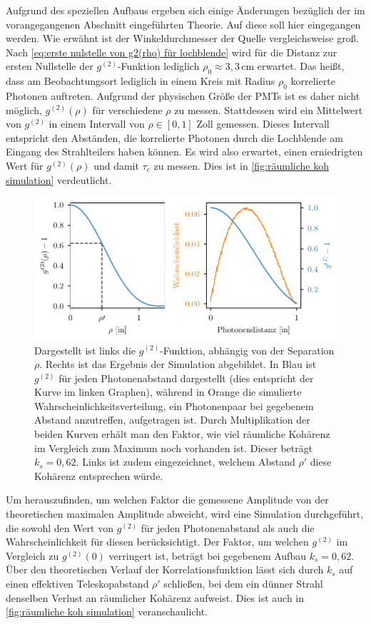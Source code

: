 Aufgrund des speziellen Aufbaus ergeben sich einige Änderungen bezüglich der im vorangegangenen Abschnitt eingeführten Theorie. 
Auf diese soll hier eingegangen werden. 
Wie erwähnt ist der Winkeldurchmesser der Quelle vergleichsweise groß. 
Nach \autoref{eq:erste nulstelle von g2(rho) für lochblende} wird für die Distanz zur ersten Nullstelle der $g^{(2)}$-Funktion lediglich $\rho_0\approx3,3\,\mathrm{cm}$ erwartet. 
Das heißt, dass am Beobachtungsort lediglich in einem Kreis mit Radius $\rho_0$ korrelierte Photonen auftreten. 
Aufgrund der physischen Größe der PMTs ist es daher nicht möglich, $g^{(2)}(\rho)$ für verschiedene $\rho$ zu messen. 
Stattdessen wird ein Mittelwert von $g^{(2)}$ in einem Intervall von $\rho\in[0,1]$ Zoll gemessen. 
Dieses Intervall entspricht den Abständen, die korrelierte Photonen durch die Lochblende am Eingang des Strahlteilers haben können. 
Es wird also erwartet, einen erniedrigten Wert für $g^{(2)}(\rho)$ und damit $\tau_c$ zu messen. 
Dies ist in \autoref{fig:räumliche koh simulation} verdeutlicht. 
\begin{figure}[h]
    \centering
    \includegraphics{images/Aufbau/g2(rho).pdf}
    \caption{Dargestellt ist links die $g^{(2)}$-Funktion, abhängig von der Separation $\rho$. Rechts ist das Ergebnis der Simulation abgebildet. In Blau ist $g^{(2)}$ für jeden Photonenabstand dargestellt (dies entspricht der Kurve im linken Graphen), während in Orange die simulierte Wahrscheinlichkeitsverteilung, ein Photonenpaar bei gegebenem Abstand anzutreffen, aufgetragen ist. Durch Multiplikation der beiden Kurven erhält man den Faktor, wie viel räumliche Kohärenz im Vergleich zum Maximum noch vorhanden ist. Dieser beträgt $k_s=0,62$. Links ist zudem eingezeichnet, welchem Abstand $\rho\prime$ diese Kohärenz entsprechen würde. }
    \label{fig:räumliche koh simulation}
\end{figure}
Um herauszufinden, um welchen Faktor die gemessene Amplitude von der theoretischen maximalen Amplitude abweicht, wird eine Simulation durchgeführt, die sowohl den Wert von $g^{(2)}$ für jeden Photonenabstand als auch die Wahrscheinlichkeit für diesen berücksichtigt. 
Der Faktor, um welchen $g^{(2)}$ im Vergleich zu $g^{(2)}(0)$ verringert ist, beträgt bei gegebenem Aufbau $k_s=0,62$. 
Über den theoretischen Verlauf der Korrelationsfunktion lässt sich durch $k_s$ auf einen effektiven Teleskopabstand $\rho\prime$ schließen, bei dem ein dünner Strahl denselben Verlust an räumlicher Kohärenz aufweist. 
Dies ist auch in \autoref{fig:räumliche koh simulation} veranschaulicht. \\


